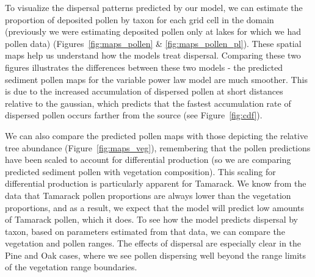\documentclass[12pt]{article}
\begin{document}



To visualize the dispersal patterns predicted by our model, we can
estimate the proportion of deposited pollen by taxon for each grid
cell in the domain (previously we were estimating deposited pollen
only at lakes for which we had pollen data)
(Figures~\ref{fig:maps_pollen} \& \ref{fig:maps_pollen_pl}). These
spatial maps help us understand how the models treat
dispersal. Comparing these two figures illustrates the differences
between these two models - the predicted sediment pollen maps for the
variable power law model are much smoother. This is due to the
increased accumulation of dispersed pollen at short distances relative
to the gaussian, which predicts that the fastest accumulation rate of
dispersed pollen occurs farther from the source (see
Figure~\ref{fig:cdf}).


We can also compare the predicted pollen maps with those depicting the
relative tree abundance (Figure~\ref{fig:maps_veg}), remembering that
the pollen predictions have been scaled to account for differential
production (so we are comparing predicted sediment pollen with
vegetation composition). This scaling for differential production is
particularly apparent for Tamarack. We know from the data that
Tamarack pollen proportions are always lower than the vegetation
proportions, and as a result, we expect that the model will predict
low amounts of Tamarack pollen, which it does. To see how the model
predicts dispersal by taxon, based on parameters estimated from that
data, we can compare the vegetation and pollen ranges. The effects of
dispersal are especially clear in the Pine and Oak cases, where we see
pollen dispersing well beyond the range limits of the vegetation range
boundaries.





\end{document}
